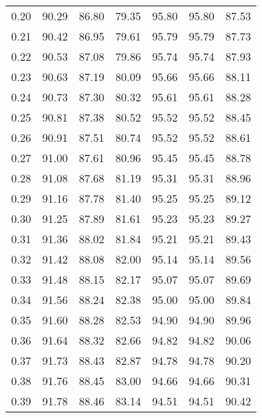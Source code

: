\begin{tabular}{|c|c|c|c|c|c|c|}
      0.20 &     90.29 &     86.80 &      79.35 &   95.80 &      95.80 &         87.53 \\
      0.21 &     90.42 &     86.95 &      79.61 &   95.79 &      95.79 &         87.73 \\
      0.22 &     90.53 &     87.08 &      79.86 &   95.74 &      95.74 &         87.93 \\
      0.23 &     90.63 &     87.19 &      80.09 &   95.66 &      95.66 &         88.11 \\
      0.24 &     90.73 &     87.30 &      80.32 &   95.61 &      95.61 &         88.28 \\
      0.25 &     90.81 &     87.38 &      80.52 &   95.52 &      95.52 &         88.45 \\
      0.26 &     90.91 &     87.51 &      80.74 &   95.52 &      95.52 &         88.61 \\
      0.27 &     91.00 &     87.61 &      80.96 &   95.45 &      95.45 &         88.78 \\
      0.28 &     91.08 &     87.68 &      81.19 &   95.31 &      95.31 &         88.96 \\
      0.29 &     91.16 &     87.78 &      81.40 &   95.25 &      95.25 &         89.12 \\
      0.30 &     91.25 &     87.89 &      81.61 &   95.23 &      95.23 &         89.27 \\
      0.31 &     91.36 &     88.02 &      81.84 &   95.21 &      95.21 &         89.43 \\
      0.32 &     91.42 &     88.08 &      82.00 &   95.14 &      95.14 &         89.56 \\
      0.33 &     91.48 &     88.15 &      82.17 &   95.07 &      95.07 &         89.69 \\
      0.34 &     91.56 &     88.24 &      82.38 &   95.00 &      95.00 &         89.84 \\
      0.35 &     91.60 &     88.28 &      82.53 &   94.90 &      94.90 &         89.96 \\
      0.36 &     91.64 &     88.32 &      82.66 &   94.82 &      94.82 &         90.06 \\
      0.37 &     91.73 &     88.43 &      82.87 &   94.78 &      94.78 &         90.20 \\
      0.38 &     91.76 &     88.45 &      83.00 &   94.66 &      94.66 &         90.31 \\
      0.39 &     91.78 &     88.46 &      83.14 &   94.51 &      94.51 &         90.42 \\

\end{tabular}

